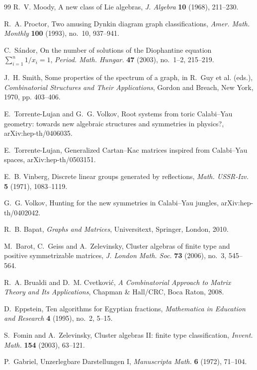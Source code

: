 \documentclass[11pt,a4paper]{article}
\theoremstyle{definition}
\theoremstyle{plain}
\begin{document}
\begin{thebibliography}{99}
R.~V. Moody, A new class of Lie algebras, \emph{J. Algebra} \textbf{10} (1968), 211--230.

R.~A. Proctor, Two amusing Dynkin diagram graph classifications, \emph{Amer. Math. Monthly} \textbf{100} (1993), no.~10, 937--941.

C.~S\'andor, On the number of solutions of the Diophantine equation $\sum_{i=1}^n 1/x_i=1$, \emph{Period. Math. Hungar.} \textbf{47} (2003), no.~1--2, 215--219.

J.~H. Smith, Some properties of the spectrum of a graph, in R.~Guy et al. (eds.), \emph{Combinatorial Structures and Their Applications}, Gordon and Breach, New York, 1970, pp. 403--406.

E.~Torrente-Lujan and G.~G. Volkov, Root systems from toric Calabi--Yau geometry: towards new algebraic structures and symmetries in physics?, arXiv:hep-th/0406035.

E.~Torrente-Lujan, Generalized Cartan--Kac matrices inspired from Calabi--Yau spaces, arXiv:hep-th/0503151.


E.~B. Vinberg, Discrete linear groups generated by reflections, \emph{Math. USSR-Izv.} \textbf{5} (1971), 1083--1119.

G.~G. Volkov, Hunting for the new symmetries in Calabi--Yau jungles, arXiv:hep-th/0402042.


R.~B. Bapat, \emph{Graphs and Matrices}, Universitext, Springer, London, 2010.

M.~Barot, C.~Geiss and A.~Zelevinsky, Cluster algebras of finite type and positive symmetrizable matrices, \emph{J. London Math. Soc.} \textbf{73} (2006), no.~3, 545--564.

R.~A. Brualdi and D.~M. Cvetkovi\'c, \emph{A Combinatorial Approach to Matrix Theory and Its Applications}, Chapman \& Hall/CRC, Boca Raton, 2008.

D.~Eppstein, Ten algorithms for Egyptian fractions, \emph{Mathematica in Education and Research} \textbf{4} (1995), no.~2, 5--15.

S.~Fomin and A.~Zelevinsky, Cluster algebras II: finite type classification, \emph{Invent. Math.} \textbf{154} (2003), 63--121.

P.~Gabriel, Unzerlegbare Darstellungen I, \emph{Manuscripta Math.} \textbf{6} (1972), 71--104.


\end{thebibliography}
\end{document}
